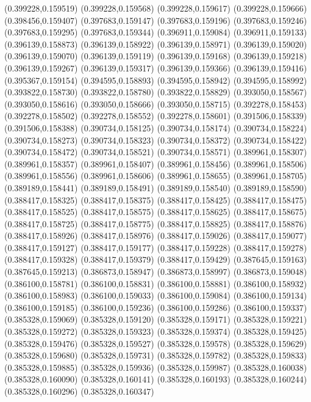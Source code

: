 (0.399228,0.159519)
(0.399228,0.159568)
(0.399228,0.159617)
(0.399228,0.159666)
(0.398456,0.159407)
(0.397683,0.159147)
(0.397683,0.159196)
(0.397683,0.159246)
(0.397683,0.159295)
(0.397683,0.159344)
(0.396911,0.159084)
(0.396911,0.159133)
(0.396139,0.158873)
(0.396139,0.158922)
(0.396139,0.158971)
(0.396139,0.159020)
(0.396139,0.159070)
(0.396139,0.159119)
(0.396139,0.159168)
(0.396139,0.159218)
(0.396139,0.159267)
(0.396139,0.159317)
(0.396139,0.159366)
(0.396139,0.159416)
(0.395367,0.159154)
(0.394595,0.158893)
(0.394595,0.158942)
(0.394595,0.158992)
(0.393822,0.158730)
(0.393822,0.158780)
(0.393822,0.158829)
(0.393050,0.158567)
(0.393050,0.158616)
(0.393050,0.158666)
(0.393050,0.158715)
(0.392278,0.158453)
(0.392278,0.158502)
(0.392278,0.158552)
(0.392278,0.158601)
(0.391506,0.158339)
(0.391506,0.158388)
(0.390734,0.158125)
(0.390734,0.158174)
(0.390734,0.158224)
(0.390734,0.158273)
(0.390734,0.158323)
(0.390734,0.158372)
(0.390734,0.158422)
(0.390734,0.158472)
(0.390734,0.158521)
(0.390734,0.158571)
(0.389961,0.158307)
(0.389961,0.158357)
(0.389961,0.158407)
(0.389961,0.158456)
(0.389961,0.158506)
(0.389961,0.158556)
(0.389961,0.158606)
(0.389961,0.158655)
(0.389961,0.158705)
(0.389189,0.158441)
(0.389189,0.158491)
(0.389189,0.158540)
(0.389189,0.158590)
(0.388417,0.158325)
(0.388417,0.158375)
(0.388417,0.158425)
(0.388417,0.158475)
(0.388417,0.158525)
(0.388417,0.158575)
(0.388417,0.158625)
(0.388417,0.158675)
(0.388417,0.158725)
(0.388417,0.158775)
(0.388417,0.158825)
(0.388417,0.158876)
(0.388417,0.158926)
(0.388417,0.158976)
(0.388417,0.159026)
(0.388417,0.159077)
(0.388417,0.159127)
(0.388417,0.159177)
(0.388417,0.159228)
(0.388417,0.159278)
(0.388417,0.159328)
(0.388417,0.159379)
(0.388417,0.159429)
(0.387645,0.159163)
(0.387645,0.159213)
(0.386873,0.158947)
(0.386873,0.158997)
(0.386873,0.159048)
(0.386100,0.158781)
(0.386100,0.158831)
(0.386100,0.158881)
(0.386100,0.158932)
(0.386100,0.158983)
(0.386100,0.159033)
(0.386100,0.159084)
(0.386100,0.159134)
(0.386100,0.159185)
(0.386100,0.159236)
(0.386100,0.159286)
(0.386100,0.159337)
(0.385328,0.159069)
(0.385328,0.159120)
(0.385328,0.159171)
(0.385328,0.159221)
(0.385328,0.159272)
(0.385328,0.159323)
(0.385328,0.159374)
(0.385328,0.159425)
(0.385328,0.159476)
(0.385328,0.159527)
(0.385328,0.159578)
(0.385328,0.159629)
(0.385328,0.159680)
(0.385328,0.159731)
(0.385328,0.159782)
(0.385328,0.159833)
(0.385328,0.159885)
(0.385328,0.159936)
(0.385328,0.159987)
(0.385328,0.160038)
(0.385328,0.160090)
(0.385328,0.160141)
(0.385328,0.160193)
(0.385328,0.160244)
(0.385328,0.160296)
(0.385328,0.160347)
